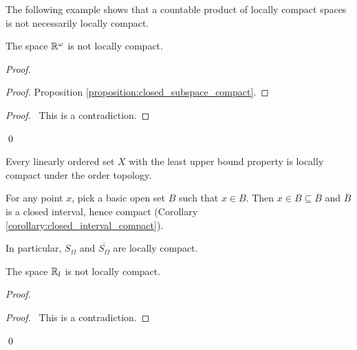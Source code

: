 The following example shows that a countable product of locally compact spaces
is not necessarily locally compact.

\begin{example}
    The space $\mathbb{R}^\omega$ is not locally compact.

    \begin{proof}
        \pf
        \begin{proof}
            \pf Proposition \ref{proposition:closed_subspace_compact}.
        \end{proof}
        \qedstep
        \begin{proof}
            \pf\ This is a contradiction.
        \end{proof}
        \qed
    \end{proof}
\end{example}

\begin{example}
    Every linearly ordered set $X$ with the least upper bound property is locally
    compact under the order topology.

    For any point $x$, pick a basic open set $B$ such that $x \in B$. Then
    $x \in B \subseteq \overline{B}$ and $\overline{B}$ is a closed interval,
    hence compact (Corollary \ref{corollary:closed_interval_compact}).

    In particular, $S_\Omega$ and $\overline{S_\Omega}$ are locally compact.
\end{example}

\begin{example}
    The space $\mathbb{R}_l$ is not locally compact.

    \begin{proof}
        \pf
        \step{2}{\pick\ $a > 0$ such that $[0,a) \subseteq U$}
        \step{4}{\pflet{$UU = \{ [0,a_1), [a_1,a_2), [a_2,a_3), \ldots \} \cup \{ \RR_l - [0,a) \}$}}
        \qedstep
        \begin{proof}
            \pf\ This is a contradiction.
        \end{proof}
        \qed
    \end{proof}
\end{example}

